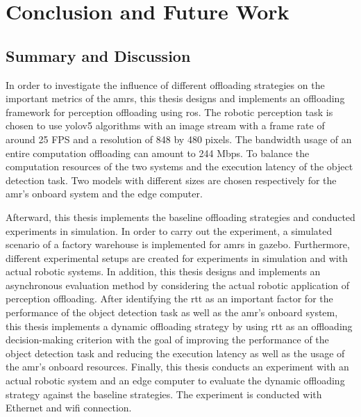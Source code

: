 \chapter{Conclusion and Future Work}\label{ch:conclusion}

\section{Summary and Discussion}\label{sec:discussion}

In order to investigate the influence of different offloading strategies on the important metrics of the \glspl{amr}, this thesis designs and implements an offloading framework for perception offloading using \gls{ros}. The robotic perception task is chosen to use \gls{yolo}v5 algorithms with an image stream with a frame rate of around 25 FPS and a resolution of 848 by 480 pixels. The bandwidth usage of an entire computation offloading can amount to 244 Mbps. To balance the computation resources of the two systems and the execution latency of the object detection task. Two models with different sizes are chosen respectively for the \gls{amr}'s onboard system and the edge computer. 

Afterward, this thesis implements the baseline offloading strategies and conducted experiments in simulation. In order to carry out the experiment, a simulated scenario of a factory warehouse is implemented for \glspl{amr} in \gls{gazebo}. Furthermore, different experimental setups are created for experiments in simulation and with actual robotic systems. In addition, this thesis designs and implements an asynchronous evaluation method by considering the actual robotic application of perception offloading. After identifying the \gls{rtt} as an important factor for the performance of the object detection task as well as the \gls{amr}'s onboard system, this thesis implements a dynamic offloading strategy by using \gls{rtt} as an offloading decision-making criterion with the goal of improving the performance of the object detection task and reducing the execution latency as well as the usage of the \gls{amr}'s onboard resources. Finally, this thesis conducts an experiment with an actual robotic system and an edge computer to evaluate the dynamic offloading strategy against the baseline strategies. The experiment is conducted with Ethernet and \gls{wifi} connection. 

